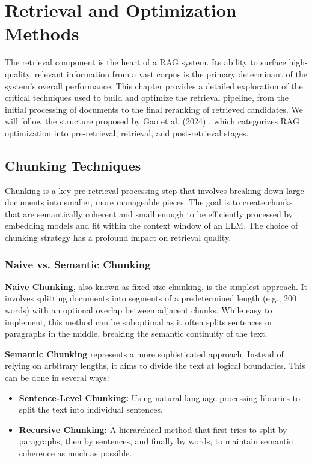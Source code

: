 \chapter{Retrieval and Optimization Methods}
\label{chap:retrieval_optimization}

The retrieval component is the heart of a RAG system. Its ability to surface high-quality, relevant information from a vast corpus is the primary determinant of the system's overall performance. This chapter provides a detailed exploration of the critical techniques used to build and optimize the retrieval pipeline, from the initial processing of documents to the final reranking of retrieved candidates. We will follow the structure proposed by Gao et al. (2024) \autocite{gao2024retrievalaugmented}, which categorizes RAG optimization into pre-retrieval, retrieval, and post-retrieval stages.

\section{Chunking Techniques}
Chunking is a key pre-retrieval processing step that involves breaking down large documents into smaller, more manageable pieces. The goal is to create chunks that are semantically coherent and small enough to be efficiently processed by embedding models and fit within the context window of an LLM. The choice of chunking strategy has a profound impact on retrieval quality.

\subsection{Naive vs. Semantic Chunking}
\textbf{Naive Chunking}, also known as fixed-size chunking, is the simplest approach. It involves splitting documents into segments of a predetermined length (e.g., 200 words) with an optional overlap between adjacent chunks. While easy to implement, this method can be suboptimal as it often splits sentences or paragraphs in the middle, breaking the semantic continuity of the text.

\textbf{Semantic Chunking} represents a more sophisticated approach. Instead of relying on arbitrary lengths, it aims to divide the text at logical boundaries. This can be done in several ways:
\begin{itemize}
    \item \textbf{Sentence-Level Chunking:} Using natural language processing libraries to split the text into individual sentences.
    \item \textbf{Recursive Chunking:} A hierarchical method that first tries to split by paragraphs, then by sentences, and finally by words, to maintain semantic coherence as much as possible.
\end{itemize}

